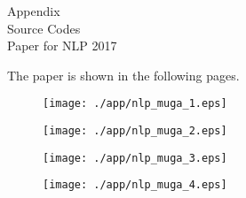 \vspace*{5.0truecm}
\begin{center}
{\Huge Appendix} \\
\vspace*{5.0truecm}
{\Large
  Source Codes\\
  Paper for NLP 2017\\
}
\end{center}

\setcounter{page}{0}

\begin{comment}
\appendix{A}{NTCIR-11 RITE-VALデータセット}


\end{comment}



The paper is shown in the following pages.
\newpage
{}

%
%
\begin{figure}[htbp]
  \begin{center}
   \texttt{[image: ./app/nlp\_muga\_1.eps]}
  \end{center}
  \label{fig:nlp_1}
\end{figure}

\begin{figure}[htbp]
  \begin{center}
   \texttt{[image: ./app/nlp\_muga\_2.eps]}
  \end{center}
  \label{fig:nlp_2}
\end{figure}

\begin{figure}[htbp]
  \begin{center}
   \texttt{[image: ./app/nlp\_muga\_3.eps]}
  \end{center}
  \label{fig:nlp_3}
\end{figure}

\begin{figure}[htbp]
  \begin{center}
   \texttt{[image: ./app/nlp\_muga\_4.eps]}
  \end{center}
  \label{fig:nlp_4}
\end{figure}

\begin{comment}
\appendix{C}{データ}
%

\end{comment}

